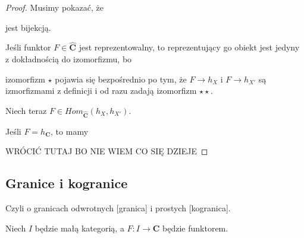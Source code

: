 \begin{proof}
  Musimy pokazać, że

  \begin{center}\end{center}

  jest bijekcją.
  
  Jeśli funktor $F\in\mathbf{\hat{C}}$ jest reprezentowalny, to reprezentujący go obiekt jest jedyny z dokładnością do izomorfizmu, bo

  \begin{center}\end{center}

  izomorfizm $\star$ pojawia się bezpośrednio po tym, że $F\to h_X$ i $F\to h_{X'}$ są izmorfizmami z definicji i od razu zadają izomorfizm $\star\star$.

  Niech teraz $F\in Hom_{\mathbf{\hat{C}}}(h_X,h_{X'})$.

  Jeśli $F=h_{\mathbf{C}}$, to mamy
  \begin{center}\end{center}

  {\large\color{red}WRÓCIĆ TUTAJ BO NIE WIEM CO SIĘ DZIEJE}

\end{proof}

\subsection{Granice i kogranice}

Czyli o granicach odwrotnych [granica] i prostych [kogranica].

Niech $I$ będzie małą kategorią, a $F:I\to\mathbf{C}$ będzie funktorem.

